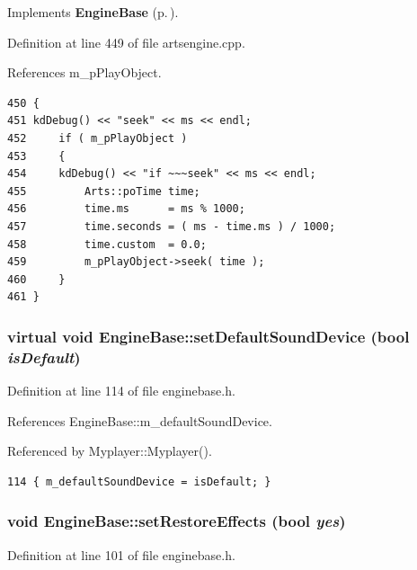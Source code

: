 Implements {\bf Engine\-Base} {\rm (p.\,\pageref{classEngineBase_EngineBasei5})}.

Definition at line 449 of file artsengine.cpp.

References m\_\-p\-Play\-Object.



\footnotesize\begin{verbatim}450 {
451 kdDebug() << "seek" << ms << endl;
452     if ( m_pPlayObject )
453     {
454     kdDebug() << "if ~~~seek" << ms << endl;
455         Arts::poTime time;
456         time.ms      = ms % 1000;
457         time.seconds = ( ms - time.ms ) / 1000;
458         time.custom  = 0.0;
459         m_pPlayObject->seek( time );
460     }
461 }
\end{verbatim}\normalsize 
{}
\subsubsection{\setlength{\rightskip}{0pt plus 5cm}virtual void Engine\-Base::set\-Default\-Sound\-Device (bool {\em is\-Default})\hspace{0.3cm}{\tt  [inline, virtual, inherited]}}\label{classEngineBase_EngineBasea27}




Definition at line 114 of file enginebase.h.

References Engine\-Base::m\_\-default\-Sound\-Device.

Referenced by Myplayer::Myplayer().



\footnotesize\begin{verbatim}114 { m_defaultSoundDevice = isDefault; }
\end{verbatim}\normalsize 
{}
\subsubsection{\setlength{\rightskip}{0pt plus 5cm}void Engine\-Base::set\-Restore\-Effects (bool {\em yes})\hspace{0.3cm}{\tt  [inline, inherited]}}\label{classEngineBase_EngineBasea15}




Definition at line 101 of file enginebase.h.

